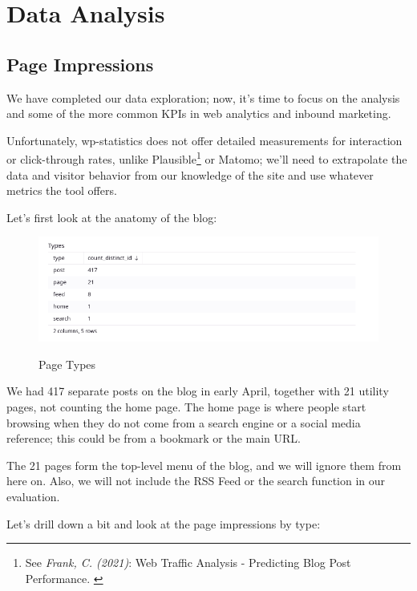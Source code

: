 %
%

\pagebreak
\section{Data Analysis}

\onehalfspacing

\subsection{Page Impressions}

We have completed our data exploration; now, it's time to focus on the analysis and some of the more common KPIs in web analytics and inbound marketing.

Unfortunately, wp-statistics does not offer detailed measurements for interaction or click-through rates, unlike Plausible\footnote{See \textit{Frank, C. (2021)}: Web Traffic Analysis - Predicting Blog Post Performance. \cite{previousBigData}} or Matomo; we'll need to extrapolate the data and visitor behavior from our knowledge of the site and use whatever metrics the tool offers.

Let's first look at the anatomy of the blog:

\begin{figure}[H]
\centering
\caption {Page Types}
\includegraphics[width=\linewidth]{images/figure10.png}
\label{fig:pageTypes}
\end{figure}

We had 417 separate posts on the blog in early April, together with 21 utility pages, not counting the home page. The home page is where people start browsing when they do not come from a search engine or a social media reference; this could be from a bookmark or the main URL. 

The 21 pages form the top-level menu of the blog, and we will ignore them from here on. Also, we will not include the RSS Feed or the search function in our evaluation.

Let's drill down a bit and look at the page impressions by type:

